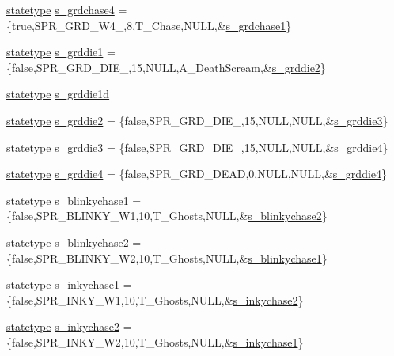 \begin{DoxyCompactItemize}
\hyperlink{structstatestruct}{statetype} \hyperlink{WL__ACT2_8C_a300ee63f6cbbc3b04ad6a46f8f553e5f}{s\_\-grdchase4} = \{true,SPR\_\-GRD\_\-W4\_,8,T\_\-Chase,NULL,\&\hyperlink{WL__DEF_8H_a1d9f3438111fc0b2e57f2c72d5e8aa42}{s\_\-grdchase1}\}
\item 
\hyperlink{structstatestruct}{statetype} \hyperlink{WL__ACT2_8C_a24864a0aad4623326b4d7ca0ead6407e}{s\_\-grddie1} = \{false,SPR\_\-GRD\_\-DIE\_,15,NULL,A\_\-DeathScream,\&\hyperlink{WL__ACT2_8C_a35c17f538a7e09ae3511a12e8b401e1f}{s\_\-grddie2}\}
\item 
\hyperlink{structstatestruct}{statetype} \hyperlink{WL__ACT2_8C_a333b92e2a38649b0efd2140520af9558}{s\_\-grddie1d}
\item 
\hyperlink{structstatestruct}{statetype} \hyperlink{WL__ACT2_8C_a35c17f538a7e09ae3511a12e8b401e1f}{s\_\-grddie2} = \{false,SPR\_\-GRD\_\-DIE\_,15,NULL,NULL,\&\hyperlink{WL__ACT2_8C_ab2a57ab74eb1827e7b329072e54a7c19}{s\_\-grddie3}\}
\item 
\hyperlink{structstatestruct}{statetype} \hyperlink{WL__ACT2_8C_ab2a57ab74eb1827e7b329072e54a7c19}{s\_\-grddie3} = \{false,SPR\_\-GRD\_\-DIE\_,15,NULL,NULL,\&\hyperlink{WL__ACT2_8C_a08860dbac097905f27be5682153d8de4}{s\_\-grddie4}\}
\item 
\hyperlink{structstatestruct}{statetype} \hyperlink{WL__ACT2_8C_a08860dbac097905f27be5682153d8de4}{s\_\-grddie4} = \{false,SPR\_\-GRD\_\-DEAD,0,NULL,NULL,\&\hyperlink{WL__ACT2_8C_a08860dbac097905f27be5682153d8de4}{s\_\-grddie4}\}
\item 
\hyperlink{structstatestruct}{statetype} \hyperlink{WL__ACT2_8C_a2a2fe6ee0d30959e050f2865d457b112}{s\_\-blinkychase1} = \{false,SPR\_\-BLINKY\_\-W1,10,T\_\-Ghosts,NULL,\&\hyperlink{WL__ACT2_8C_a8c216682f7337d096e7bbd584590b317}{s\_\-blinkychase2}\}
\item 
\hyperlink{structstatestruct}{statetype} \hyperlink{WL__ACT2_8C_a8c216682f7337d096e7bbd584590b317}{s\_\-blinkychase2} = \{false,SPR\_\-BLINKY\_\-W2,10,T\_\-Ghosts,NULL,\&\hyperlink{WL__DEF_8H_a2a2fe6ee0d30959e050f2865d457b112}{s\_\-blinkychase1}\}
\item 
\hyperlink{structstatestruct}{statetype} \hyperlink{WL__ACT2_8C_afade892255b75dc0ab582ffaed0e17d8}{s\_\-inkychase1} = \{false,SPR\_\-INKY\_\-W1,10,T\_\-Ghosts,NULL,\&\hyperlink{WL__ACT2_8C_ad357c8f3bb6a71e213ab45fd06f67489}{s\_\-inkychase2}\}
\item 
\hyperlink{structstatestruct}{statetype} \hyperlink{WL__ACT2_8C_ad357c8f3bb6a71e213ab45fd06f67489}{s\_\-inkychase2} = \{false,SPR\_\-INKY\_\-W2,10,T\_\-Ghosts,NULL,\&\hyperlink{WL__ACT2_8C_afade892255b75dc0ab582ffaed0e17d8}{s\_\-inkychase1}\}

\end{DoxyCompactItemize}
